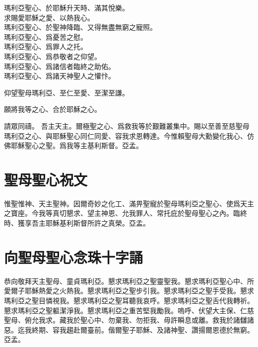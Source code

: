 \versicle 瑪利亞聖心、於耶穌升天時、滿其悅樂。\\
\hfill \response 求賜愛耶穌之愛、以熱我心。\\
瑪利亞聖心、於聖神降臨、又得無盡無窮之寵照。\\
瑪利亞聖心、爲憂苦之慰。\\
瑪利亞聖心、爲罪人之托。\\
瑪利亞聖心、爲恭敬者之仰望。\\
瑪利亞聖心、爲諸信者臨終之助佑。\\
瑪利亞聖心、爲諸天神聖人之懽忭。

\versicle 仰望聖母瑪利亞、至仁至愛、至潔至謙。

\Response 願將我等之心、合於耶穌之心。

請眾同禱。 吾主天主。爾極聖之心、爲救我等於艱難叢集中。賜以至善至慈聖母瑪利亞之心、與耶穌聖心同仁同愛、容我求恩轉達。今惟賴聖母大勳變化我心、仿佛耶穌聖心之聖。爲我等主基利斯督。{\cspace}亞孟。

\section*{聖母聖心祝文}
惟聖惟神、天主聖神。因爾奇妙之化工、滿畀聖寵於聖母瑪利亞之聖心、使爲天主之寶座。今我等真切懇求、望主神恩、允我罪人、常托庇於聖母聖心之內。臨終時、獲享吾主耶穌基利斯督所許之真榮。{\cspace}亞孟。

\section*{向聖母聖心念珠十字誦}
恭向敬拜天主聖母、童貞瑪利亞。懇求瑪利亞之聖靈聖我。懇求瑪利亞聖心中、所愛爾子耶穌熱愛之火熱我。懇求瑪利亞之聖步引我。懇求瑪利亞之聖手受我。懇求瑪利亞之聖目憐視我。懇求瑪利亞之聖耳聽我哀呼。懇求瑪利亞之聖舌代我轉祈。懇求瑪利亞之聖軀潔淨我。懇求瑪利亞之重苦堅我勵我。嗚呼、伏望大主保、仁慈聖母、俯允我求。藏我於聖心中、勿棄我、勿拒我、毋許瞬息或離。救我於諸讎諸惡。迄我終期、容我趨赴爾臺前。偕爾聖子耶穌、及諸神聖、讚揚爾恩德於無窮。{\cspace}亞孟。
